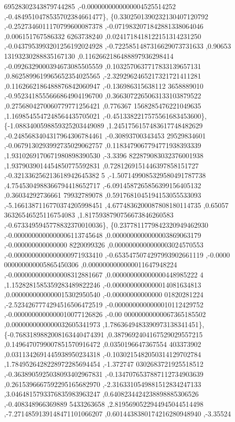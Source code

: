 \begin{DoxyCode}
      69528302343879744285 ,-0.0000000000000004525514252 ,-0.4849510478535702384661477\},
\{0.3302501390232130407120792 ,-0.2527346011170799600087378 ,-0.0719832071842881338064046 ,0.006151767586332
      6263738240 ,0.0241718418122151314231250 ,-0.0437953993201256192024928 ,-0.7225851487316629073731633 ,0.90653
      13193230288835167130 ,0.1162662186488897936298414 ,-0.0926329000394673085505559 ,0.1032570637717833139657131
       ,0.8625899619965652354025565 ,-2.3292962465217321721411281 ,0.1162662186488876842060947 ,-0.136986315638112
      3658889010 ,-0.9523418555666864904196700 ,0.3663072265063133103879522 ,0.2756804270060779771256421 ,0.776367
      1568285476221049635 ,1.1698545547248564435705021 ,-0.4513382217575561683453600\},
\{-1.0883400598859325203449089 ,1.2451756157483617748482629 ,-0.2485683404317964306784461 ,-0.30893700343453
      29529834601 ,-0.0679130293992735029062757 ,0.1183479067794771938393339 ,1.9310269170671980898390530 ,-3.3396
      822879083032376001938 ,1.9379039014454850775592831 ,0.7281269151446397858151727 ,-0.321336256213618942645382
      5 ,-1.5071499085329580491787738 ,4.7545304988366794418652717 ,-6.0914587265856399156405132 ,0.36034292736661
      79932789078 ,0.5917681045194153055533093 ,-5.1661387116770374205998451 ,4.6774836200087808180114735 ,0.65057
      36326546525116754083 ,1.8175938790756673846260583 ,-0.6733495945778832370010036\},
\{0.2377811779842320949462930 ,-0.0000000000000006113745648 ,0.0000000000000003869063179 ,-0.000000000000000
      8220099326 ,0.0000000000000003024570553 ,-0.0000000000000000971933410 ,-0.6535475074297993902661119 ,-0.0000
      000000000005865450306 ,0.0000000000000011647948224 ,-0.0000000000000008312881667 ,0.000000000000000448985222
      4 ,1.1528281585359283489822246 ,-0.0000000000000014081634813 ,0.0000000000000015302950540 ,-0.00000000000000
      01820281224 ,-2.5234267774294516506472519 ,-0.0000000000000010112429752 ,-0.0000000000000010077126826 ,-0.00
      00000000000067365185502 ,0.0000000000000032605341973 ,1.7863649483390973138341451\},
\{-0.7683189882008163440474391 ,0.3879692404167529029557215 ,0.1496470799007851570916472 ,0.0350196647367554
      403373902 ,0.0311342691445938950234318 ,-0.1030215482050314129702784 ,1.7849526428228972285694454 ,-1.372747
      0302683721925518512 ,-0.3638905925038093402967831 ,-0.1347076537887112734903639 ,0.2615396667592295165682970
       ,-2.3163310549881512834247133 ,3.0464815793376835983963247 ,0.6408234424238898885306526 ,-0.408348966369889
      5433263658 ,2.8195690522944945044514498 ,-7.2714859139148471101066207 ,0.6014438380174216280948940 ,-3.35524

\end{DoxyCode}
